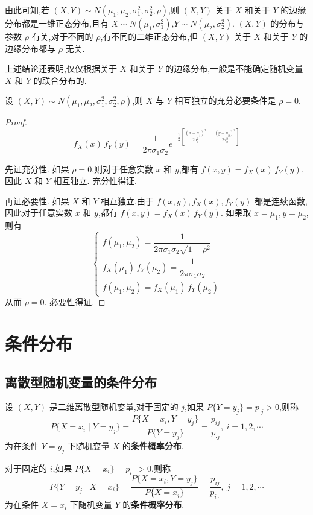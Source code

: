 由此可知,若 $(X,Y) \sim N(\mu_1,\mu_2,\sigma_1^2,\sigma_2^2,\rho)$,则 $(X,Y)$ 关于 $X$ 和关于 $Y$ 的边缘分布都是一维正态分布,且有 $X \sim N(\mu_1,\sigma_1^2)$,$Y \sim N(\mu_2,\sigma_2^2)$. $(X,Y)$ 的分布与参数 $\rho$ 有关,对于不同的 $\rho$,有不同的二维正态分布,但 $(X,Y)$ 关于 $X$ 和关于 $Y$ 的边缘分布都与 $\rho$ 无关.

上述结论还表明,仅仅根据关于 $X$ 和关于 $Y$ 的边缘分布,一般是不能确定随机变量 $X$ 和 $Y$ 的联合分布的.

\begin{conclusion}
    设 $(X,Y) \sim N(\mu_1,\mu_2,\sigma_1^2,\sigma_2^2,\rho)$,则 $X$ 与 $Y$ 相互独立的充分必要条件是 $\rho=0$.
\end{conclusion}

\begin{proof}
    $$
    f_{X}(x) \, f_{Y}(y) = \dfrac{1}{2 \pi \sigma_1 \sigma_2} e^{-\frac{1}{2} \left[ \frac{(x-\mu_1)^2}{2 \sigma_1^2} + \frac{(y-\mu_2)^2}{2 \sigma_2^2} \right]}
    $$

    先证充分性. 如果 $\rho=0$,则对于任意实数 $x$ 和 $y$,都有 $f(x,y) = f_{X}(x) \, f_{Y}(y)$,因此 $X$ 和 $Y$ 相互独立. 充分性得证.

    再证必要性. 如果 $X$ 和 $Y$ 相互独立,由于 $f(x,y), f_{X}(x), f_{Y}(y)$ 都是连续函数,因此对于任意实数 $x$ 和 $y$,都有 $f(x,y) = f_{X}(x) \, f_{Y}(y)$. 如果取 $x=\mu_1, y=\mu_2$,则有
    $$
    \begin{cases}
        f(\mu_1,\mu_2) = \dfrac{1}{2 \pi \sigma_1 \sigma_2 \sqrt{1-\rho^2}} \\[0.5em]
        f_{X}(\mu_1) \, f_{Y}(\mu_2) = \dfrac{1}{2 \pi \sigma_1 \sigma_2} \\[0.5em]
        f(\mu_1,\mu_2) = f_{X}(\mu_1) \, f_{Y}(\mu_2)
    \end{cases}
    $$
    从而 $\rho=0$. 必要性得证.
\end{proof}

\section{条件分布}

\subsection{离散型随机变量的条件分布}

\begin{definition}
    设 $(X,Y)$ 是二维离散型随机变量,对于固定的 $j$,如果 $P\{Y = y_j\} = p_{\cdot j} > 0$,则称
    $$
    P\{X=x_i \mid Y=y_j\} = \dfrac{P\{X=x_i, Y=y_j\}}{P\{Y=y_j\}} = \dfrac{p_{ij}}{p_{\cdot j}},\ i=1,2,\cdots
    $$
    为在条件 $Y=y_j$ 下随机变量 $X$ 的\textbf{条件概率分布}.
    
    对于固定的 $i$,如果 $P\{X=x_i\} = p_{i \cdot} > 0$,则称
    $$
    P\{Y=y_j \mid X=x_i\} = \dfrac{P\{X=x_i,Y=y_j\}}{P\{X=x_i\}} = \dfrac{p_{ij}}{p_{i \cdot}},\ j=1,2,\cdots
    $$
    为在条件 $X=x_i$ 下随机变量 $Y$ 的\textbf{条件概率分布}.
\end{definition}

